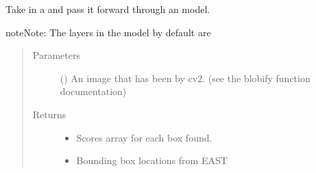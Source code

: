 \documentclass[letterpaper,10pt,english]{sphinxmanual}
\begin{document}
\begin{fulllineitems}
\label{\detokenize{api:readpyne.core.forward}}
Take in a  and pass it forward through an  model.

\begin{sphinxadmonition}{note}{Note:}
The layers in the model by default are 
\end{sphinxadmonition}
\begin{quote}\begin{description}
\item[{Parameters}] \leavevmode
{} () \textendash{} An image that has been  by cv2.
(see the blobify function documentation)

\item[{Returns}] \leavevmode
\begin{itemize}
\item {} 
 \textendash{} Scores array for each box found.

\item {} 
 \textendash{} Bounding box locations from EAST

\end{itemize}


\end{description}\end{quote}

\end{fulllineitems}

\end{document}
